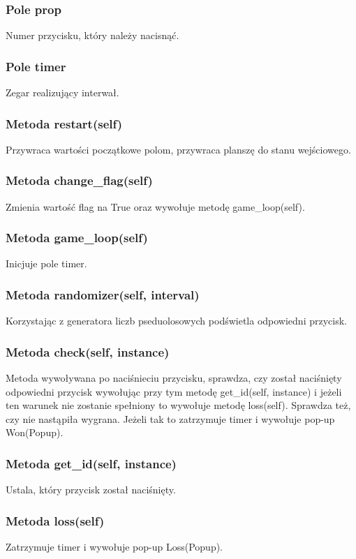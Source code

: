 \documentclass[11pt]{article}
\begin{document}
\subsubsection{Pole prop}
Numer przycisku, który należy nacisnąć.
\subsubsection{Pole timer}
Zegar realizujący interwał.
\subsubsection{Metoda restart(self)}
Przywraca wartości początkowe polom, przywraca planszę do stanu wejściowego.
\subsubsection{Metoda change\_flag(self)}
Zmienia wartość flag na True oraz wywołuje metodę game\_loop(self).
\subsubsection{Metoda game\_loop(self)}
Inicjuje pole timer.
\subsubsection{Metoda randomizer(self, interval)}
Korzystając z generatora liczb pseduolosowych podświetla odpowiedni przycisk.
\subsubsection{Metoda check(self, instance)}
Metoda wywoływana po naciśnieciu przycisku, sprawdza, czy został naciśnięty odpowiedni przycisk wywołując przy tym metodę get\_id(self, instance) i jeżeli ten warunek nie zostanie spełniony to wywołuje metodę loss(self). Sprawdza też, czy nie nastąpiła wygrana. Jeżeli tak to zatrzymuje timer i wywołuje pop-up Won(Popup).
\subsubsection{Metoda get\_id(self, instance)}
Ustala, który przycisk został naciśnięty.
\subsubsection{Metoda loss(self)}
Zatrzymuje timer i wywołuje pop-up Loss(Popup).
\end{document}
